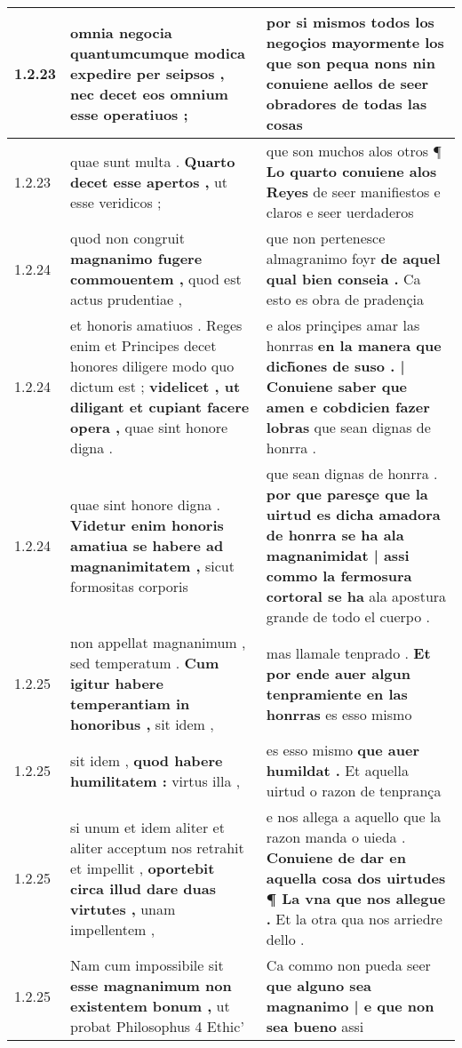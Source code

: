 \begin{tabular}{|p{1cm}|p{6.5cm}|p{6.5cm}|}
1.2.23 & omnia negocia \textbf{ quantumcumque modica expedire per seipsos , } nec decet eos omnium esse operatiuos ; & por si mismos todos los negoçios \textbf{ mayormente los que son pequa nons } nin conuiene aellos de seer obradores de todas las cosas \\\hline
1.2.23 & quae sunt multa . \textbf{ Quarto decet esse apertos , } ut esse veridicos ; & que son muchos alos otros ¶ \textbf{ Lo quarto conuiene alos Reyes } de seer manifiestos e claros e seer uerdaderos \\\hline
1.2.24 & quod non congruit \textbf{ magnanimo fugere commouentem , } quod est actus prudentiae , & que non pertenesce almagranimo foyr \textbf{ de aquel qual bien conseia . } Ca esto es obra de pradençia \\\hline
1.2.24 & et honoris amatiuos . Reges enim et Principes decet honores diligere modo quo dictum est ; \textbf{ videlicet , ut diligant et cupiant facere opera , } quae sint honore digna . & e alos prinçipes amar las honrras \textbf{ en la manera que dich̃ones de suso . | Conuiene saber que amen e cobdicien fazer lobras } que sean dignas de honrra . \\\hline
1.2.24 & quae sint honore digna . \textbf{ Videtur enim honoris amatiua se habere ad magnanimitatem , } sicut formositas corporis & que sean dignas de honrra . \textbf{ por que paresçe que la uirtud es dicha amadora de honrra se ha ala magnanimidat | assi commo la fermosura cortoral se ha } ala apostura grande de todo el cuerpo . \\\hline
1.2.25 & non appellat magnanimum , sed temperatum . \textbf{ Cum igitur habere temperantiam in honoribus , } sit idem , & mas llamale tenprado . \textbf{ Et por ende auer algun tenpramiente en las honrras } es esso mismo \\\hline
1.2.25 & sit idem , \textbf{ quod habere humilitatem : } virtus illa , & es esso mismo \textbf{ que auer humildat . } Et aquella uirtud o razon de tenprança \\\hline
1.2.25 & si unum et idem aliter et aliter acceptum nos retrahit et impellit , \textbf{ oportebit circa illud dare duas virtutes , } unam impellentem , & e nos allega a aquello que la razon manda o uieda . \textbf{ Conuiene de dar en aquella cosa dos uirtudes ¶ La vna que nos allegue . } Et la otra qua nos arriedre dello . \\\hline
1.2.25 & Nam cum impossibile sit \textbf{ esse magnanimum non existentem bonum , } ut probat Philosophus 4 Ethic’ & Ca commo non pueda seer \textbf{ que alguno sea magnanimo | e que non sea bueno } assi \\\hline

\end{tabular}
